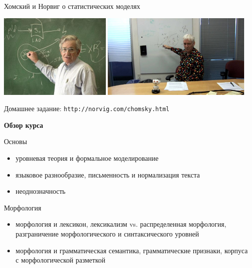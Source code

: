 \documentclass{beamer}
\begin{document}
\begin{frame}{Хомский и Норвиг о статистических моделях}
\begin{center}
        \includegraphics[width=0.41\textwidth]{chomsky.jpg}
        \hfill
        \includegraphics[width=0.55\textwidth]{norvig.jpg}
\end{center}
Домашнее задание: \texttt{http://norvig.com/chomsky.html}
\end{frame}



\begin{frame}{}
\begin{center}
	\textbf{Обзор курса}
\end{center}
\end{frame}

\begin{frame}{Основы}
\begin{itemize}
	\item уровневая теория и формальное моделирование
	\item языковое разнообразие, письменность и нормализация текста
	\item неоднозначность
\end{itemize}
\end{frame}

\begin{frame}{Морфология}
\begin{itemize}
	\item морфология и лексикон, лексикализм vs. распределенная морфология, разграничение морфологического и синтаксического уровней
	\item морфология и грамматическая семантика, грамматические признаки, корпуса с морфологической разметкой
\end{itemize}
\end{frame}
\end{document}
